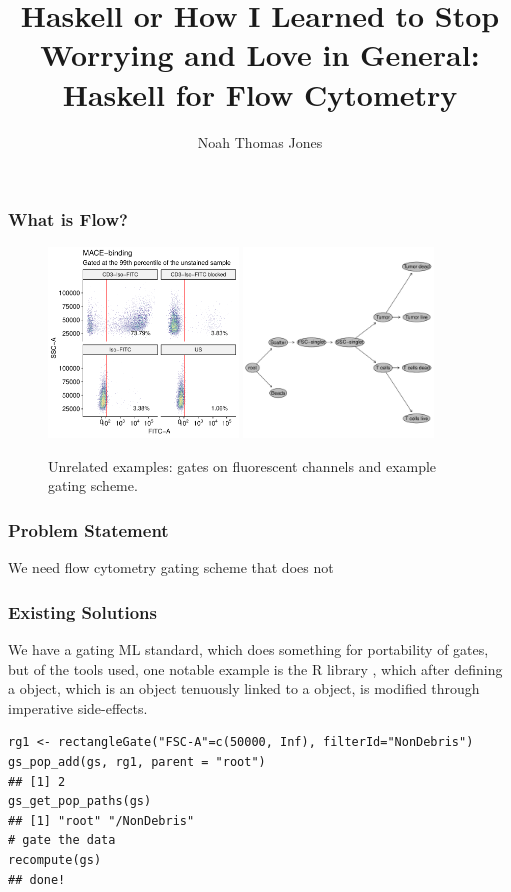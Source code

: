 \documentclass{beamer}
\title{Haskell or How I Learned to Stop Worrying and Love in General: Haskell for Flow Cytometry}
\author{Noah Thomas Jones}
\institute{University of Florida}
\date{}
\begin{document}
\frame{\titlepage}

\begin{frame}
  \frametitle{What is Flow?}
  \begin{figure}
    \centering
    \includegraphics[width=0.45\textwidth]{./images/NJ030_MACE-binding.pdf}
    \includegraphics[width=0.45\textwidth]{./images/NJ017_gates.pdf}
    \caption{Unrelated examples: gates on fluorescent channels and
      example gating scheme.}
  \end{figure}
\end{frame}

\begin{frame}
  \frametitle{Problem Statement}
  We need flow cytometry gating scheme that does not
\end{frame}

\begin{frame}[fragile]
  \frametitle{Existing Solutions} We have a gating ML
  standard\cite{spidlen2015isac}, which does something for portability
  of gates, but of the tools used, one notable example is the R
  library , which after defining a  object,
  which is an object tenuously linked to a  object, is
  modified through imperative side-effects.
\begin{verbatim}
rg1 <- rectangleGate("FSC-A"=c(50000, Inf), filterId="NonDebris")
gs_pop_add(gs, rg1, parent = "root")
## [1] 2
gs_get_pop_paths(gs)
## [1] "root" "/NonDebris"
# gate the data
recompute(gs)
## done!
\end{verbatim}
\end{frame}
\end{document}
